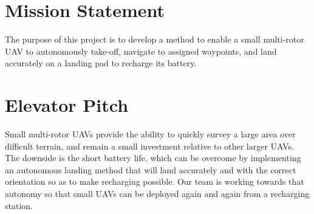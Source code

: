 
\section{Mission Statement}
The purpose of this project is to develop a method to enable a small multi-rotor UAV to autonomously take-off, navigate to assigned waypoints, and land accurately on a landing pad to recharge its battery.

\section{Elevator Pitch}
Small multi-rotor UAVs provide the ability to quickly survey a large area over difficult terrain, and remain a small investment relative to other larger UAVs. The downside is the short battery life, which can be overcome by implementing an autonomous landing method that will land accurately and with the correct orientation so as to make recharging possible. Our team is working towards that autonomy so that small UAVs can be deployed again and again from a recharging station.
